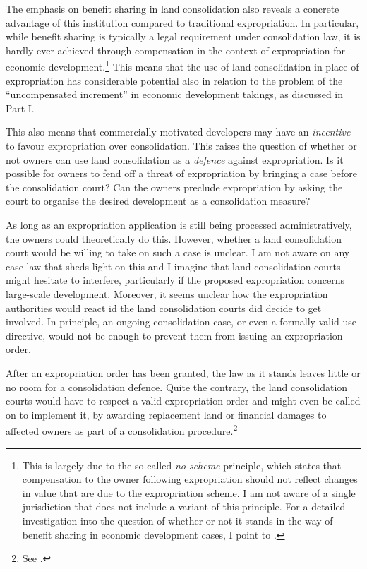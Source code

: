 The emphasis on benefit sharing in land consolidation also reveals a concrete  advantage of this institution compared to traditional expropriation. In particular, while benefit sharing is typically a legal requirement under consolidation law, it is hardly ever achieved through compensation in the context of expropriation for economic development.\footnote{This is largely due to the so-called {\it no scheme} principle, which states that compensation to the owner following expropriation should not reflect changes in value that are due to the expropriation scheme. I am not aware of a single jurisdiction that does not include a variant of this principle. For a detailed investigation into the question of whether or not it stands in the way of benefit sharing in economic development cases, I point to \cite{dyrkolbotn15}.} This means that the use of land consolidation in place of expropriation has considerable potential also in relation to the problem of the ``uncompensated increment'' in economic development takings, as discussed in Part I.

This also means that commercially motivated developers may have an {\it incentive} to favour expropriation over consolidation. This raises the question of whether or not owners can use land consolidation as a {\it defence} against expropriation. Is it possible for owners to fend off a threat of expropriation by bringing a case before the consolidation court? Can the owners preclude expropriation by asking the court to organise the desired development as a consolidation measure?

As long as an expropriation application is still being processed administratively, the owners could theoretically do this. However, whether a land consolidation court would be willing to take on such a case is unclear. I am not aware on any case law that sheds light on this and I imagine that land consolidation courts might hesitate to interfere, particularly if the proposed expropriation concerns large-scale development. Moreover, it seems unclear how the expropriation authorities would react id the land consolidation courts did decide to get involved. In principle, an ongoing consolidation case, or even a formally valid use directive, would not be enough to prevent them from issuing an expropriation order.

After an expropriation order has been granted, the law as it stands leaves little or no room for a consolidation defence. Quite the contrary, the land consolidation courts would have to respect a valid expropriation order and might even be called on to implement it, by awarding replacement land or financial damages to affected owners as part of a consolidation procedure.\footnote{See \cite[6]{lca79}.}


